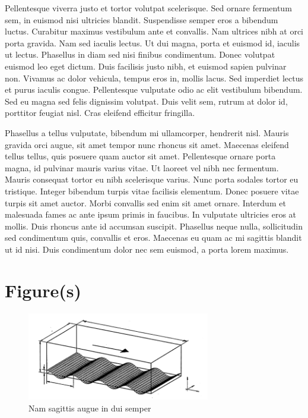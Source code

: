 \documentclass[a4paper,12pt]{article}
\begin{document}
Pellentesque viverra justo et tortor volutpat scelerisque. Sed ornare fermentum sem, in euismod nisi ultricies blandit. Suspendisse semper eros a bibendum luctus. Curabitur maximus vestibulum ante et convallis. Nam ultrices nibh at orci porta gravida. Nam sed iaculis lectus. Ut dui magna, porta et euismod id, iaculis ut lectus. Phasellus in diam sed nisi finibus condimentum. Donec volutpat euismod leo eget dictum. Duis facilisis justo nibh, et euismod sapien pulvinar non. Vivamus ac dolor vehicula, tempus eros in, mollis lacus. Sed imperdiet lectus et purus iaculis congue. Pellentesque vulputate odio ac elit vestibulum bibendum. Sed eu magna sed felis dignissim volutpat. Duis velit sem, rutrum at dolor id, porttitor feugiat nisl. Cras eleifend efficitur fringilla. 

Phasellus a tellus vulputate, bibendum mi ullamcorper, hendrerit nisl. Mauris gravida orci augue, sit amet tempor nunc rhoncus sit amet. Maecenas eleifend tellus tellus, quis posuere quam auctor sit amet. Pellentesque ornare porta magna, id pulvinar mauris varius vitae. Ut laoreet vel nibh nec fermentum. Mauris consequat tortor eu nibh scelerisque varius. Nunc porta sodales tortor eu tristique. Integer bibendum turpis vitae facilisis elementum. Donec posuere vitae turpis sit amet auctor. Morbi convallis sed enim sit amet ornare. Interdum et malesuada fames ac ante ipsum primis in faucibus. In vulputate ultricies eros at mollis. Duis rhoncus ante id accumsan suscipit. Phasellus neque nulla, sollicitudin sed condimentum quis, convallis et eros. Maecenas eu quam ac mi sagittis blandit ut id nisi. Duis condimentum dolor nec sem euismod, a porta lorem maximus.

\section*{Figure(s)}

\begin{figure}[htp]
\centering
\includegraphics[width=8cm]{figuexample.png}
\caption{Nam sagittis augue in dui semper}
\label{fig:image}
\end{figure}
\end{document}

